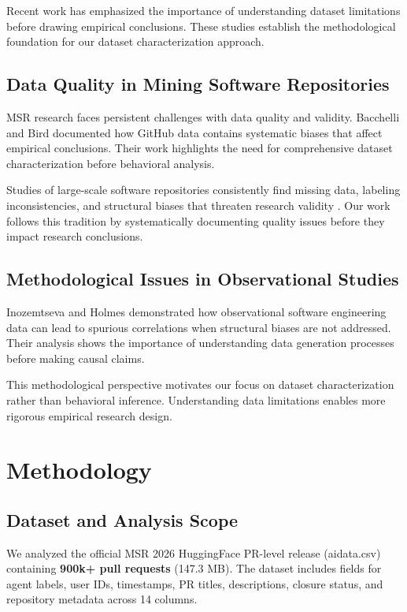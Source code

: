 \documentclass[conference]{IEEEtran}
\begin{document}
Recent work has emphasized the importance of understanding dataset limitations before drawing empirical conclusions. These studies establish the methodological foundation for our dataset characterization approach.

\subsection{Data Quality in Mining Software Repositories}

MSR research faces persistent challenges with data quality and validity. Bacchelli and Bird \cite{bacchelli2013expectations} documented how GitHub data contains systematic biases that affect empirical conclusions. Their work highlights the need for comprehensive dataset characterization before behavioral analysis.

Studies of large-scale software repositories consistently find missing data, labeling inconsistencies, and structural biases that threaten research validity \cite{niu2022role}. Our work follows this tradition by systematically documenting quality issues before they impact research conclusions.

\subsection{Methodological Issues in Observational Studies}

Inozemtseva and Holmes \cite{inozemtseva2014coverage} demonstrated how observational software engineering data can lead to spurious correlations when structural biases are not addressed. Their analysis shows the importance of understanding data generation processes before making causal claims.

This methodological perspective motivates our focus on dataset characterization rather than behavioral inference. Understanding data limitations enables more rigorous empirical research design.

\section{Methodology}

\subsection{Dataset and Analysis Scope}

We analyzed the official MSR 2026 HuggingFace PR-level release (aidata.csv) containing \textbf{900k+ pull requests} (147.3 MB). The dataset includes fields for agent labels, user IDs, timestamps, PR titles, descriptions, closure status, and repository metadata across 14 columns.
\end{document}
